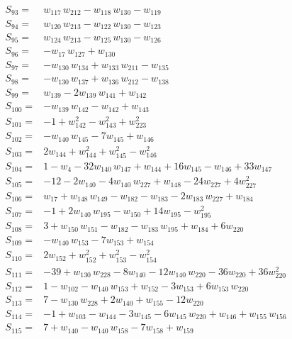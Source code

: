 \documentclass[11pt]{article}
\theoremstyle{remark}\newtheorem{remark}[theorem]{Remark}
\begin{document}
\begin{align*}
S_{93}={}& w_{117}\,w_{212} - w_{118}\,w_{130} - w_{119} \\[2pt]
S_{94}={}& w_{120}\,w_{213} - w_{122}\,w_{130} - w_{123} \\[2pt]
S_{95}={}& w_{124}\,w_{213} - w_{125}\,w_{130} - w_{126} \\[2pt]
S_{96}={}& -w_{17}\,w_{127} + w_{130} \\[2pt]
S_{97}={}& -w_{130}\,w_{134} + w_{133}\,w_{211} - w_{135} \\[2pt]
S_{98}={}& -w_{130}\,w_{137} + w_{136}\,w_{212} - w_{138} \\[2pt]
S_{99}={}& w_{139} - 2w_{139}\,w_{141} + w_{142} \\[2pt]
S_{100}={}& -w_{139}\,w_{142} - w_{142} + w_{143} \\[2pt]
S_{101}={}& -1 + w_{142}^{2} - w_{143}^{2} + w_{223}^{2} \\[2pt]
S_{102}={}& -w_{140}\,w_{145} - 7w_{145} + w_{146} \\[2pt]
S_{103}={}& 2w_{144} + w_{144}^{2} + w_{145}^{2} - w_{146}^{2} \\[2pt]
S_{104}={}& 1 - w_{4} - 32w_{140}\,w_{147} + w_{144} + 16w_{145} - w_{146} + 33w_{147} \\[2pt]
S_{105}={}& -12 - 2w_{140} - 4w_{140}\,w_{227} + w_{148} - 24w_{227} + 4w_{227}^{2} \\[2pt]
S_{106}={}& w_{17} + w_{148}\,w_{149} - w_{182} - w_{183} - 2w_{183}\,w_{227} + w_{184} \\[2pt]
S_{107}={}& -1 + 2w_{140}\,w_{195} - w_{150} + 14w_{195} - w_{195}^{2} \\[2pt]
S_{108}={}& 3 + w_{150}\,w_{151} - w_{182} - w_{183}\,w_{195} + w_{184} + 6w_{220} \\[2pt]
S_{109}={}& -w_{140}\,w_{153} - 7w_{153} + w_{154} \\[2pt]
S_{110}={}& 2w_{152} + w_{152}^{2} + w_{153}^{2} - w_{154}^{2} \\[2pt]
S_{111}={}& -39 + w_{130}\,w_{228} - 8w_{140} - 12w_{140}\,w_{220} - 36w_{220} + 36w_{220}^{2} \\[2pt]
S_{112}={}& 1 - w_{102} - w_{140}\,w_{153} + w_{152} - 3w_{153} + 6w_{153}\,w_{220} \\[2pt]
S_{113}={}& 7 - w_{130}\,w_{228} + 2w_{140} + w_{155} - 12w_{220} \\[2pt]
S_{114}={}& -1 + w_{103} - w_{144} - 3w_{145} - 6w_{145}\,w_{220} + w_{146} + w_{155}\,w_{156} \\[2pt]
S_{115}={}& 7 + w_{140} - w_{140}\,w_{158} - 7w_{158} + w_{159} \\[2pt]

\end{align*}
\end{document}
